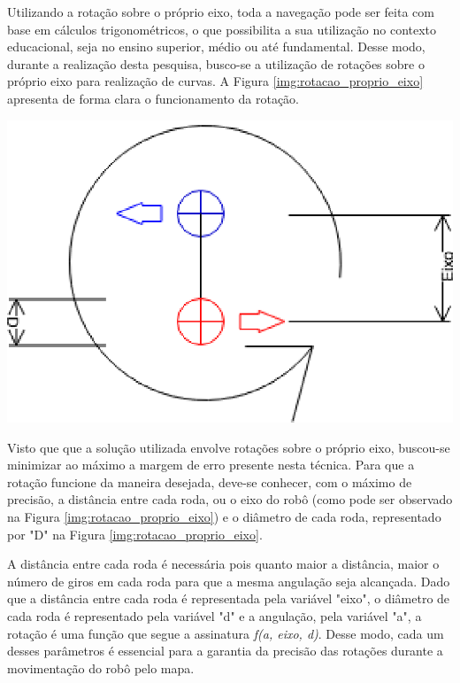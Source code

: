 Utilizando a rotação sobre o próprio eixo, toda a navegação pode ser feita com base em cálculos trigonométricos, o que possibilita
a sua utilização no contexto educacional, seja no ensino superior, médio ou até fundamental. Desse modo, durante a realização desta pesquisa, busco-se
 a utilização de rotações sobre o próprio eixo para realização de curvas. A Figura \ref{img:rotacao_proprio_eixo} apresenta de forma
 clara o funcionamento da rotação.

 {\centering
 \includegraphics[scale=1.2]{figuras/rotacao_eixo.eps}
 \label{img:rotacao_proprio_eixo}
 \par}

 Visto que que a solução utilizada envolve rotações sobre o próprio eixo, buscou-se minimizar ao máximo a margem de erro presente nesta
 técnica. Para que a rotação funcione da maneira desejada, deve-se conhecer, com o máximo de precisão, a distância entre cada roda,
 ou o eixo do robô (como pode ser observado na Figura \ref{img:rotacao_proprio_eixo}) e o diâmetro de cada roda, representado por "D" na
 Figura \ref{img:rotacao_proprio_eixo}.

 A distância entre cada roda é necessária pois quanto maior a distância, maior o número de giros em cada roda para que a mesma angulação
 seja alcançada. Dado que a distância entre cada roda é representada pela variável "eixo", o diâmetro de cada roda é representado pela
 variável "d" e a angulação, pela variável "a", a rotação é uma função que segue a assinatura \textit{f(a, eixo, d)}. Desse modo, cada um
 desses parâmetros é essencial para a garantia da precisão das rotações durante a movimentação do robô pelo mapa.

